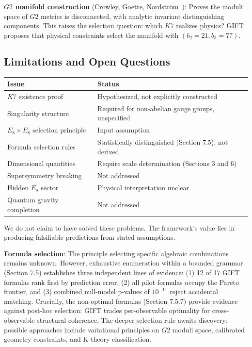 \documentclass[11pt,a4paper]{article}
\newcommand{\E}{\mathrm{E}}
\newcommand{\Gtwo}{\mathrm{G}_2}
\newcommand{\Kseven}{K_7}
\def\Gtwo{G2}%
\def\Kseven{K7}%
\def\E{E}%
\begin{document}
\textbf{$\Gtwo$ manifold construction} (Crowley, Goette, Nordstr\"om~\cite{crowley2025}): Proves the moduli space of $\Gtwo$ metrics is disconnected, with analytic invariant distinguishing components. This raises the selection question: which $\Kseven$ realizes physics? GIFT proposes that physical constraints select the manifold with $(b_2=21, b_3=77)$.

\subsection{Limitations and Open Questions}

\begin{table}[H]
\centering
\small
\begin{tabular}{lp{8cm}}
\toprule
Issue & Status \\
\midrule
$\Kseven$ existence proof & Hypothesized, not explicitly constructed \\
Singularity structure & Required for non-abelian gauge groups, unspecified \\
$\E_8 \times \E_8$ selection principle & Input assumption \\
Formula selection rules & Statistically distinguished (Section 7.5), not derived \\
Dimensional quantities & Require scale determination (Sections 3 and 6) \\
Supersymmetry breaking & Not addressed \\
Hidden $\E_8$ sector & Physical interpretation unclear \\
Quantum gravity completion & Not addressed \\
\bottomrule
\end{tabular}
\end{table}

We do not claim to have solved these problems. The framework's value lies in producing falsifiable predictions from stated assumptions.

\textbf{Formula selection}: The principle selecting specific algebraic combinations remains unknown. However, exhaustive enumeration within a bounded grammar (Section 7.5) establishes three independent lines of evidence: (1) 12 of 17 GIFT formulas rank first by prediction error, (2) all pilot formulas occupy the Pareto frontier, and (3) combined null-model p-values of $10^{-11}$ reject accidental matching. Crucially, the non-optimal formulas (Section 7.5.7) provide evidence against post-hoc selection: GIFT trades per-observable optimality for cross-observable structural coherence. The deeper selection rule awaits discovery; possible approaches include variational principles on $\Gtwo$ moduli space, calibrated geometry constraints, and K-theory classification.
\end{document}
